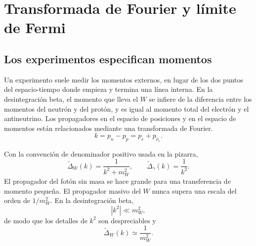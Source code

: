 \begin{classroomqa}
\end{classroomqa}

\section{Transformada de Fourier y límite de Fermi}

\subsection{Los experimentos especifican momentos}

Un experimento suele medir los momentos externos, en lugar de los dos puntos del espacio-tiempo donde empieza y termina una línea interna. En la desintegración beta, el momento que lleva el \(W\) se infiere de la diferencia entre los momentos del neutrón y del protón, y es igual al momento total del electrón y el antineutrino. Los propagadores en el espacio de posiciones y en el espacio de momentos están relacionados mediante una transformada de Fourier.
\begin{equation}
  k=p_n-p_p=p_e+p_{\bar\nu_e}.
\end{equation}

Con la convención de denominador positivo usada en la pizarra,
\begin{equation}
  \widetilde{\Delta}_W(k)=\frac1{k^2+m_W^2},
  \qquad
  \widetilde{\Delta}_\gamma(k)=\frac1{k^2}.
\end{equation}
El propagador del fotón sin masa se hace grande para una transferencia de momento pequeña. El propagador masivo del \(W\) nunca supera una escala del orden de \(1/m_W^2\). En la desintegración beta,
\begin{equation}
  |k^2|\ll m_W^2,
\end{equation}
de modo que los detalles de \(k^2\) son despreciables y
\begin{equation}
  \widetilde{\Delta}_W(k)\simeq\frac1{m_W^2}.
\end{equation}

